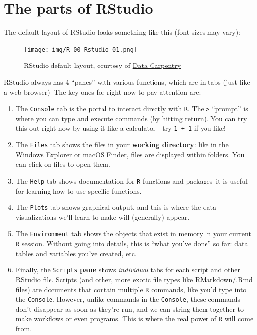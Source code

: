 \documentclass[
]{book}
\providecommand{\tightlist}{%
  \setlength{\itemsep}{0pt}\setlength{\parskip}{0pt}}
\begin{document}
\hypertarget{the-parts-of-rstudio}{%
\section{The parts of RStudio}\label{the-parts-of-rstudio}}

The default layout of RStudio looks something like this (font sizes may vary):

\begin{figure}
\centering
\texttt{[image: img/R\_00\_Rstudio\_01.png]}
\caption{RStudio default layout, courtesy of \href{https://datacarpentry.org/r-socialsci/00-intro/index.html}{Data Carpentry}}
\end{figure}

RStudio always has 4 ``panes'' with various functions, which are in tabs (just like a web browser). The key ones for right now to pay attention are:

\begin{enumerate}
\def\labelenumi{\arabic{enumi}.}
\tightlist
\item
  The \texttt{Console} tab is the portal to interact directly with \texttt{R}. The \texttt{\textgreater{}} ``prompt'' is where you can type and execute commands (by hitting return). You can try this out right now by using it like a calculator - try \texttt{1\ +\ 1} if you like!
\item
  The \texttt{Files} tab shows the files in your \textbf{working directory}: like in the Windows Explorer or macOS Finder, files are displayed within folders. You can click on files to open them.
\item
  The \texttt{Help} tab shows documentation for \texttt{R} functions and packages--it is useful for learning how to use specific functions.
\item
  The \texttt{Plots} tab shows graphical output, and this is where the data visualizations we'll learn to make will (generally) appear.
\item
  The \texttt{Environment} tab shows the objects that exist in memory in your current \texttt{R} session. Without going into details, this is ``what you've done'' so far: data tables and variables you've created, etc.
\item
  Finally, the \texttt{Scripts} \textbf{pane} shows \emph{individual} tabs for each script and other RStudio file. Scripts (and other, more exotic file types like RMarkdown/.Rmd files) are documents that contain multiple \texttt{R} commands, like you'd type into the \texttt{Console}. However, unlike commands in the \texttt{Console}, these commands don't disappear as soon as they're run, and we can string them together to make workflows or even programs. This is where the real power of \texttt{R} will come from.
\end{enumerate}
\end{document}
